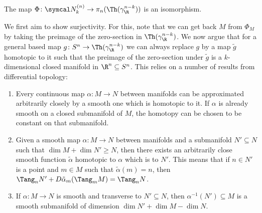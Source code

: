 \begin{theorem}	
	The map $\Phi\colon \Bord_k^{(n)} \to \pi_n(\Th(\gamma_\R^{n - k}))$ is an isomorphism.
\end{theorem}
We first aim to show surjectivity.
For this, note that we can get back $M$ from $\Phi_M$ by taking the preimage of the zero-section in $\Th(\gamma_\R^{n - k})$.
We now argue that for a general based map $g\colon S^n \to \Th(\gamma_\R^{n - k})$ we can always replace $g$ by a map $\tilde{g}$ homotopic to it such that the preimage of the zero-section under $\tilde{g}$ is a $k$-dimensional closed manifold in $\R^n \subseteq S^n$.
This relies on a number of results from differential topology:
\begin{proposition}\label{prop:smoothapprox}
	\leavevmode
	\begin{enumerate}
		\item Every continuous map $\alpha\colon M \to N$ between manifolds can be approximated arbitrarily closely by a smooth one which is homotopic to it.
			If $\alpha$ is already smooth on a closed submanifold of $M$, the homotopy can be chosen to be constant on that submanifold.
		\item Given a smooth map $\alpha\colon M \to N$ between manifolds and a submanifold $N' \subseteq N$ such that $\dim M + \dim N' \geq N$, then there exists an arbitrarily close smooth function $\tilde{\alpha}$ homotopic to $\alpha$ which is  to $N'$.
			This means that if $n \in N'$ is a point and $m \in M$ such that $\tilde{\alpha}(m) = n$, then $\Tang_n N' + D \tilde{\alpha}_m (\Tang_m M) = \Tang_n N$.
		\item If $\alpha\colon M \to N$ is smooth and transverse to $N' \subseteq N$, then $\alpha^{-1}(N') \subseteq M$ is a smooth submanifold of dimension $\dim N' + \dim M - \dim N$.
	\end{enumerate}
\end{proposition}

